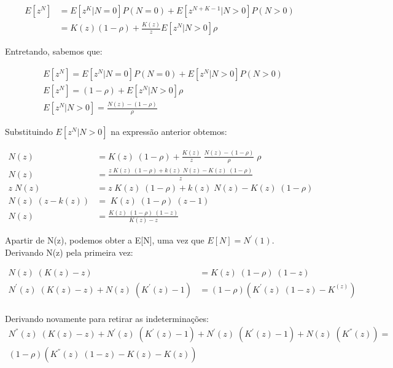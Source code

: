 \documentclass[a4paper]{article}
\begin{document}
\begin{itemize}
     \begin{center}
         \begin{align*}
            E[z^N] &= E[z^{K}| N = 0]P(N = 0) + E[z^{N+K-1} | N>0]P(N>0)\\
            &=K(z)(1-\rho)+ \frac{K(z)}{z} E[z^{N} | N>0]\rho
         \end{align*}
    \end{center}
    Entretando, sabemos que: 
    \begin{center}
         \begin{align*}
            &E[z^N] = E[z^{N}| N = 0]P(N = 0) + E[z^{N} | N>0]P(N>0)\\
            &E[z^N] =(1-\rho)+ E[z^{N} | N>0]\rho\\
            &E[z^{N} | N>0] = \frac{N(z)-(1-\rho)}{\rho}
         \end{align*}
    \end{center}
    Substituindo \(E[z^{N} | N>0]\) na expressão anterior obtemos:
    \begin{center}
         \begin{align*}
            N(z) &= K(z)\;(1-\rho) + \frac{K(z)}{z}\; \frac{N(z)-(1-\rho)}{\rho}\; \rho\\
            N(z) &= \frac{z\;K(z)\;(1-\rho) + k(z)\;N(z) - K(z)\;(1-\rho)}{z}\\
            z\;N(z) &= z\;K(z)\;(1-\rho) + k(z)\;N(z) - K(z)\;(1-\rho)\\
            N(z)\;(z-k(z)) &= \;K(z)\;(1-\rho)\; (z-1)\\
            N(z) &= \frac{K(z)\;(1-\rho)\; (1-z)}{K(z)-z} 
         \end{align*}
    \end{center}
    Apartir de N(z), podemos obter a E[N], uma vez que \(E[N] = N^{'}(1)\). Derivando N(z) pela primeira vez:
    \begin{center}
         \begin{align*}
           N(z)\;(K(z)-z) &= K(z)\;(1-\rho)\; (1-z)\\
           N^{'}(z)\;(K(z)-z) +  N(z)\;(K^{'}(z)-1) &= (1-\rho)(K^{'}(z)\;(1-z) - K^(z))\\ 
         \end{align*}
    \end{center}
    Derivando novamente para retirar as indeterminações:
    \begin{align*}
       N^{''}(z)\;(K(z)-z) + N^{'}(z)\;(K^{'}(z)-1) +  N^{'}(z)\;(K^{'}(z)-1) +  N(z)\;(K^{''}(z)) =\\ (1-\rho)(K^{''}(z)\;(1-z) - K(z)- K(z))\\ 

\end{align*}
\end{itemize}
\end{document}
